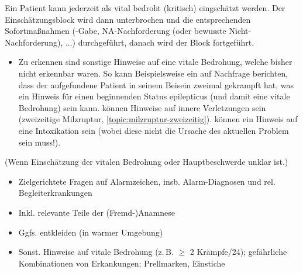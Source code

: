 {{Ein Patient kann jederzeit als vital bedroht (kritisch) eingschätzt
werden. Der Einschätzungsblock wird dann unterbrochen und die
entsprechenden Sofortmaßnahmen (\protect{}-Gabe, NA-Nachforderung (oder bewusste
Nicht-Nachforderung), ...) durchgeführt, danach wird der Block
fortgeführt.}

\begin{itemize}
  \item[\eye] Zu erkennen sind sonstige Hinweise auf
eine vitale Bedrohung, welche bisher nicht erkennbar waren.
So kann Beispielsweise ein  auf Nachfrage
berichten, dass der aufgefundene Patient in seinem Beisein
zweimal gekrampft hat, was ein Hinweis für einen
beginnenden Status epilepticus (und damit eine vitale
Bedrohung) sein kann.  können Hinweise auf
innere Verletzungen sein (zweizeitige Milzruptur,
\ref{topic:milzruptur-zweizeitig}).  können ein
Hinweis auf eine Intoxikation sein (wobei diese nicht die
Ursache des aktuellen Problem sein muss!).
\end{itemize}
}{%
{\tiny (Wenn Einschätzung der vitalen
Bedrohung oder Hauptbeschwerde unklar ist.)}

\begin{itemize}
  \item Zielgerichtete Fragen auf Alarmzeichen, insb.
  Alarm-Diagnosen und rel. Begleiterkrankungen
  \item Inkl. relevante Teile der (Fremd-)Anamnese
  \item Ggfs. entkleiden (in warmer Umgebung)
  \item[\eye] Sonst. Hinweise auf vitale Bedrohung (z.\,B.
  $\geq$ 2 Krämpfe/24\Hour*); gefährliche Kombinationen von
  Erkankungen; Prellmarken, Einstiche
\end{itemize}
}{}{}{}



